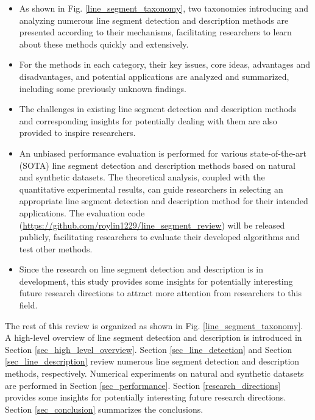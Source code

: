 \documentclass[journal,compsoc]{IEEEtran}
\begin{document}
\begin{itemize}
	\item As shown in Fig. \ref{line_segment_taxonomy}, two taxonomies introducing and analyzing numerous line segment detection and description methods are presented according to their mechanisms, facilitating researchers to learn about these methods quickly and extensively.
	
	\item For the methods in each category, their key issues, core ideas, advantages and disadvantages, and potential applications are analyzed and summarized, including some previously unknown findings.
	
	\item The challenges in existing line segment detection and description methods and corresponding insights for potentially dealing with them are also provided to inspire researchers.
	
	\item An unbiased performance evaluation is performed for various state-of-the-art (SOTA) line segment detection and description methods based on natural and synthetic datasets. The theoretical analysis, coupled with the quantitative experimental results, can guide researchers in selecting an appropriate line segment detection and description method for their intended applications. The evaluation code (\url{https://github.com/roylin1229/line_segment_review}) will be released publicly, facilitating researchers to evaluate their developed algorithms and test other methods.
	
	\item Since the research on line segment detection and description is in development, this study provides some insights for potentially interesting future research directions to attract more attention from researchers to this field.
\end{itemize}

The rest of this review is organized as shown in Fig. \ref{line_segment_taxonomy}. A high-level overview of line segment detection and description is introduced in Section \ref{sec_high_level_overview}. Section \ref{sec_line_detection} and Section \ref{sec_line_description} review numerous line segment detection and description methods, respectively. Numerical experiments on natural and synthetic datasets are performed in Section \ref{sec_performance}. Section \ref{research_directions} provides some insights for potentially interesting future research directions. Section \ref{sec_conclusion} summarizes the conclusions.
\end{document}
